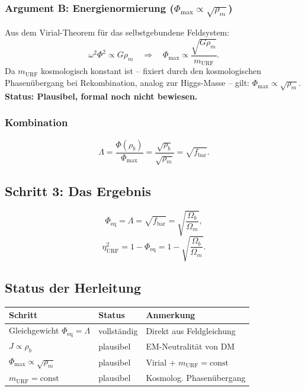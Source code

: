 \documentclass[12pt,a4paper]{article}
\theoremstyle{definition}
\begin{document}
\subsubsection{Argument B: Energienormierung ($\Phi_{\mathrm{max}} \propto \sqrt{\rho_m}$)}

Aus dem Virial-Theorem für das selbstgebundene Feldsystem:
\begin{equation}
\omega^2\Phi^2 \propto G\rho_m \quad \Rightarrow \quad
\Phi_{\mathrm{max}} \propto \frac{\sqrt{G\rho_m}}{m_{\mathrm{URF}}}.
\end{equation}
Da $m_{\mathrm{URF}}$ kosmologisch konstant ist -- fixiert durch den
kosmologischen Phasenübergang bei Rekombination, analog zur Higgs-Masse --
gilt: $\Phi_{\mathrm{max}} \propto \sqrt{\rho_m}$.
\textbf{Status: Plausibel, formal noch nicht bewiesen.}

\subsubsection{Kombination}

\begin{equation}
\Lambda = \frac{\Phi(\rho_b)}{\Phi_{\mathrm{max}}}
= \frac{\sqrt{\rho_b}}{\sqrt{\rho_m}} = \sqrt{f_{\mathrm{bar}}}.
\end{equation}

\subsection{Schritt 3: Das Ergebnis}

\begin{equation}
\Phi_{\mathrm{eq}} = \Lambda = \sqrt{f_{\mathrm{bar}}}
= \sqrt{\frac{\Omega_b}{\Omega_m}},
\end{equation}
\begin{equation}
\boxed{\eta_{\mathrm{URF}}^2 = 1 - \Phi_{\mathrm{eq}} = 1 - \sqrt{\frac{\Omega_b}{\Omega_m}}.}
\end{equation}

\subsection{Status der Herleitung}

\begin{center}
\begin{tabular}{p{5cm}p{2.5cm}p{5cm}}
\toprule
Schritt & Status & Anmerkung \\
\midrule
Gleichgewicht $\Phi_{\mathrm{eq}} = \Lambda$ & vollständig & Direkt aus Feldgleichung \\
$J \propto \rho_b$ & plausibel & EM-Neutralität von DM \\
$\Phi_{\mathrm{max}} \propto \sqrt{\rho_m}$ & plausibel & Virial + $m_{\mathrm{URF}}=\mathrm{const}$ \\
$m_{\mathrm{URF}} = \mathrm{const}$ & plausibel & Kosmolog. Phasenübergang \\
\bottomrule
\end{tabular}
\end{center}
\end{document}
